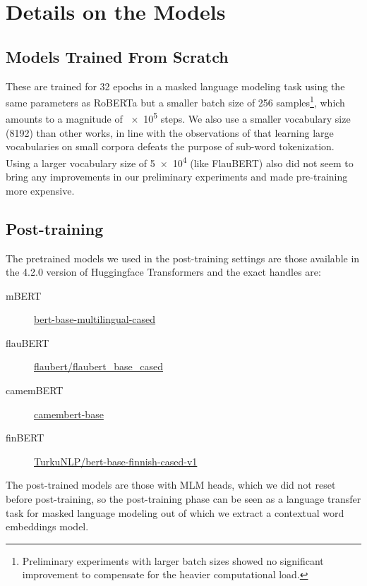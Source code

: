 \section{Details on the Models}

\subsection{Models Trained From Scratch}

These are trained for \num{32} epochs in a masked language modeling task using the same parameters as RoBERTa \citep{liu-etal-2019-roberta} but a smaller batch size of \num{256} samples\footnote{Preliminary experiments with larger batch sizes showed no significant improvement to compensate for the heavier computational load.}, which amounts to a magnitude of \num{e5} steps.
We also use a smaller vocabulary size (\num{8192}) than other works, in line with the observations of \citet{ding-etal-2019-call} that learning large vocabularies on small corpora defeats the purpose of sub-word tokenization.
Using a larger vocabulary size of \num{5e4} (like FlauBERT) also did not seem to bring any improvements in our preliminary experiments and made pre-training more expensive.

\subsection{Post-training}

The pretrained models we used in the post-training settings are those available in the 4.2.0 version of Huggingface Transformers \citep{wolf-etal-2020-transformers} and the exact handles are:

\begin{description}
    \item[mBERT] \href{https://huggingface.co/bert-base-multilingual-cased}{bert-base-multilingual-cased}
    \item[flauBERT] \href{https://huggingface.co/flaubert/flaubert_base_cased}{flaubert/flaubert\_base\_cased}
    \item[camemBERT] \href{https://huggingface.co/camembert-base}{camembert-base}
    \item[finBERT] \href{https://huggingface.co/TurkuNLP/bert-base-finnish-cased-v1}{TurkuNLP/bert-base-finnish-cased-v1}
\end{description}

The post-trained models are those with MLM heads, which we did not reset before post-training, so the post-training phase can be seen as a language transfer task for masked language modeling out of which we extract a contextual word embeddings model.

